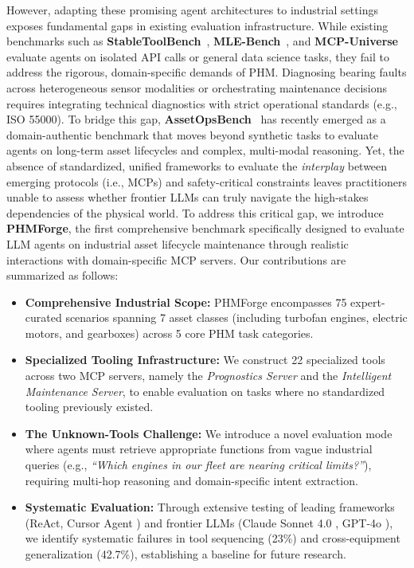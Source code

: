 \documentclass[sigconf,review]{acmart}
\begin{document}
However, adapting these promising agent architectures to industrial settings exposes fundamental gaps in existing evaluation infrastructure. While existing benchmarks such as \textbf{StableToolBench}~\cite{guo2025stabletoolbenchstablelargescalebenchmarking}, \textbf{MLE-Bench}~\cite{chan2025mlebenchevaluatingmachinelearning}, and \textbf{MCP-Universe}~\cite{luo2025mcpuniversebenchmarkinglargelanguage} evaluate agents on isolated API calls or general data science tasks, they fail to address the rigorous, domain-specific demands of PHM. Diagnosing bearing faults across heterogeneous sensor modalities or orchestrating maintenance decisions requires integrating technical diagnostics with strict operational standards (e.g., ISO 55000). To bridge this gap, \textbf{AssetOpsBench}~\cite{patel2025assetopsbenchbenchmarkingaiagents} has recently emerged as a domain-authentic benchmark that moves beyond synthetic tasks to evaluate agents on long-term asset lifecycles and complex, multi-modal reasoning. Yet, the absence of standardized, unified frameworks to evaluate the \emph{interplay} between emerging protocols (i.e., MCPs) and safety-critical constraints leaves practitioners unable to assess whether frontier LLMs can truly navigate the high-stakes dependencies of the physical world.
To address this critical gap, we introduce \textbf{PHMForge}, the first comprehensive benchmark specifically designed to evaluate LLM agents on industrial asset lifecycle maintenance through realistic interactions with domain-specific MCP servers. Our contributions are summarized as follows:
\begin{itemize}
    \item \textbf{Comprehensive Industrial Scope:} PHMForge encompasses 75 expert-curated scenarios spanning 7 asset classes (including turbofan engines, electric motors, and gearboxes) across 5 core PHM task categories.
    \item \textbf{Specialized Tooling Infrastructure:} We construct 22 specialized tools across two MCP servers, namely the \textit{Prognostics Server} and the \textit{Intelligent Maintenance Server}, to enable evaluation on tasks where no standardized tooling previously existed.
    \item \textbf{The Unknown-Tools Challenge:} We introduce a novel evaluation mode where agents must retrieve appropriate functions from vague industrial queries (e.g., \textit{``Which engines in our fleet are nearing critical limits?''}), requiring multi-hop reasoning and domain-specific intent extraction.
    \item \textbf{Systematic Evaluation:} Through extensive testing of leading frameworks (ReAct, Cursor Agent \cite{cursor_docs}) and frontier LLMs (Claude Sonnet 4.0 \cite{claude_sonnet_docs}, GPT-4o \cite{gpt_4o}), we identify systematic failures in tool sequencing (23\%) and cross-equipment generalization (42.7\%), establishing a baseline for future research.
\end{itemize}
\end{document}
